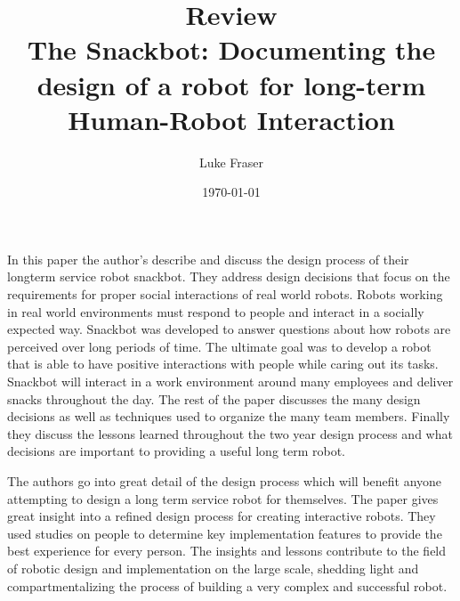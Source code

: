 \documentclass{article}
\begin{document}
\title{{\large Review} \\ The Snackbot: Documenting the design of a robot for long-term Human-Robot Interaction}
\author{Luke Fraser}
\date{\today}
\maketitle

\begingroup
\renewcommand{\section}[2]{}


\endgroup

\section*{Summary}
In this paper the author's describe and discuss the design process of their longterm service robot snackbot. They address design decisions that focus on the requirements for proper social interactions of real world robots. Robots working in real world environments must respond to people and interact in a socially expected way. Snackbot was developed to answer questions about how robots are perceived over long periods of time. The ultimate goal was to develop a robot that is able to have positive interactions with people while caring out its tasks. Snackbot will interact in a work environment around many employees and deliver snacks throughout the day. The rest of the paper discusses the many design decisions as well as techniques used to organize the many team members. Finally they discuss the lessons learned throughout the two year design process and what decisions are important to providing a useful long term robot.
\section*{Strengths}
The authors go into great detail of the design process which will benefit anyone attempting to design a long term service robot for themselves. The paper gives great insight into a refined design process for creating interactive robots. They used studies on people to determine key implementation features to provide the best experience for every person. The insights and lessons contribute to the field of robotic design and implementation on the large scale, shedding light and compartmentalizing the process of building a very complex and successful robot.
\end{document}
